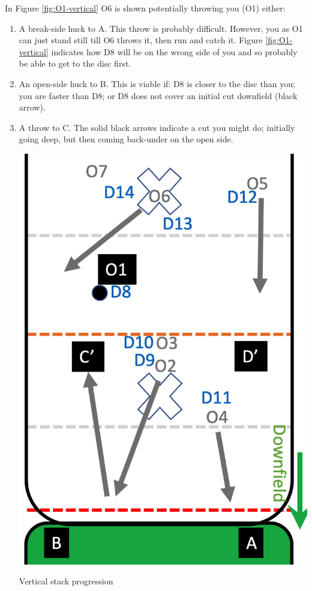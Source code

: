 \documentclass{tufte-handout}
\begin{document}
In Figure \ref{fig:O1-vertical} 
O6 is shown
potentially throwing 
you (O1) either:
\begin{enumerate}
\item A break-side 
huck to A.
This throw is 
probably 
difficult. 
However, you as O1
can just
stand still 
till O6 throws it, 
then run and catch it.
Figure \ref{fig:O1-vertical} indicates how 
D8 will be on the wrong side of you
and so probably 
be able to get to the disc
first.
\item An open-side huck to B. 
This is viable if: 
D8 is closer to the disc than you; 
you are faster than D8; or 
D8 does not cover 
an initial cut downfield (black arrow). 
\item A throw 
to C.
The solid black arrows indicate 
a cut you might do;
initially going deep,
but then coming back-under
on the open side.


\begin{marginfigure}%
  \includegraphics[width=\linewidth]{O1-vertical2}
  \caption{Vertical stack progression}
  \label{fig:O1-vertical2}
\end{marginfigure}





\end{enumerate}
\end{document}
